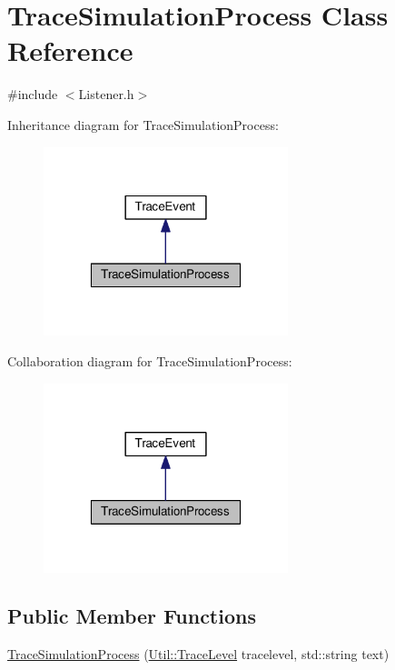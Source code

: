 \hypertarget{class_trace_simulation_process}{\section{Trace\-Simulation\-Process Class Reference}
\label{class_trace_simulation_process}
}


{\ttfamily \#include $<$Listener.\-h$>$}



Inheritance diagram for Trace\-Simulation\-Process\-:
\nopagebreak
\begin{figure}[H]
\begin{center}
\leavevmode
\includegraphics[width=202pt]{class_trace_simulation_process__inherit__graph}
\end{center}
\end{figure}


Collaboration diagram for Trace\-Simulation\-Process\-:
\nopagebreak
\begin{figure}[H]
\begin{center}
\leavevmode
\includegraphics[width=202pt]{class_trace_simulation_process__coll__graph}
\end{center}
\end{figure}
\subsection*{Public Member Functions}
\begin{DoxyCompactItemize}
\item 
\hyperlink{class_trace_simulation_process_a20762e9f477719c87c135896e345f4a6}{Trace\-Simulation\-Process} (\hyperlink{class_util_a604561d00f5999b5ca280401140e58d9}{Util\-::\-Trace\-Level} tracelevel, std\-::string text)
\end{DoxyCompactItemize}


